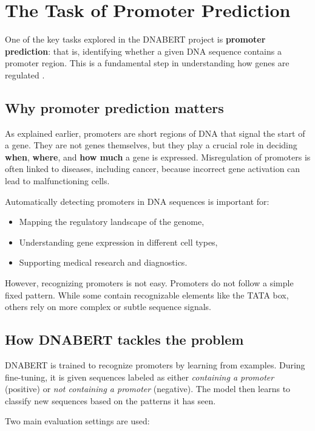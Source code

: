 \section{The Task of Promoter Prediction}

One of the key tasks explored in the DNABERT project is \textbf{promoter prediction}: that is, identifying whether a given DNA sequence contains a promoter region. This is a fundamental step in understanding how genes are regulated \cite{10.1093/bioinformatics/bty1068}.

\subsection{Why promoter prediction matters}

As explained earlier, promoters are short regions of DNA that signal the start of a gene. They are not genes themselves, but they play a crucial role in deciding \textbf{when}, \textbf{where}, and \textbf{how much} a gene is expressed. Misregulation of promoters is often linked to diseases, including cancer, because incorrect gene activation can lead to malfunctioning cells.

Automatically detecting promoters in DNA sequences is important for:
\begin{itemize}
\item Mapping the regulatory landscape of the genome,
\item Understanding gene expression in different cell types,
\item Supporting medical research and diagnostics.
\end{itemize}

However, recognizing promoters is not easy. Promoters do not follow a simple fixed pattern. While some contain recognizable elements like the TATA box, others rely on more complex or subtle sequence signals.

\subsection{How DNABERT tackles the problem}

DNABERT is trained to recognize promoters by learning from examples. During fine-tuning, it is given sequences labeled as either \textit{containing a promoter} (positive) or \textit{not containing a promoter} (negative). The model then learns to classify new sequences based on the patterns it has seen.

Two main evaluation settings are used:

